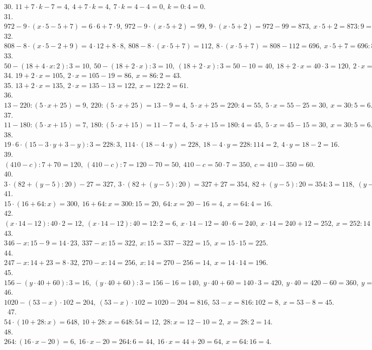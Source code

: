 \documentclass[12pt]{article}
\begin{document}
30. $11+7\cdot k-7=4,\ 4+7\cdot k=4,\ 7\cdot k =4-4=0,\ k=0:4=0.$\\
31. $972-9\cdot(x\cdot 5-5+7)=6\cdot6+7\cdot9,\ 972-9\cdot(x\cdot 5+2)=99,\ 9\cdot(x\cdot 5+2)=972-99=873,\ x\cdot 5+2=873:9=97,\ x\cdot 5=97-2=95,\ x=95:5=19.$\\
32. $808-8\cdot(x\cdot5-2+9)=4\cdot12+8\cdot8,\ 808-8\cdot(x\cdot5+7)=112,\ 8\cdot(x\cdot5+7)=808-112=696,\ x\cdot5+7=696:8=87,\ x\cdot5=87-7=80,\ x=80:5=16.$\\
33. $50-(18+4\cdot x:2):3=10,\ 50-(18+2\cdot x):3=10,\ (18+2\cdot x):3=50-10=40,\ 18+2\cdot x=40\cdot3=120,\ 2\cdot x=120-18=102,\ x=102:2=51.$\\
34. $19+2\cdot x=105,\ 2\cdot x=105-19=86,\ x=86:2=43.$\\
35. $13+2\cdot x=135,\ 2\cdot x=135-13=122,\ x=122:2=61.$\\
36. $13-220:(5\cdot x+25)=9,\ 220:(5\cdot x+25)=13-9=4,\ 5\cdot x+25=220:4=55,\ 5\cdot x=55-25=30,\ x=30:5=6.$\\
37. $11-180:(5\cdot x+15)=7,\ 180:(5\cdot x+15)=11-7=4,\ 5\cdot x+15=180:4=45,\ 5\cdot x =45-15=30,\ x=30:5=6.$\\
38. $19\cdot6\cdot(15-3\cdot y+3-y):3=228:3,\ 114\cdot(18-4\cdot y)=228,\ 18-4\cdot y=228:114=2,\ 4\cdot y=18-2=16.$\\
39. $(410-c):7+70=120,\ (410-c):7=120-70=50,\ 410-c=50\cdot7=350,\ c=410-350=60.$\\
40. $3\cdot(82+(y-5):20)-27=327,\ 3\cdot(82+(y-5):20)=327+27=354,\ 82+(y-5):20=354:3=118,\ (y-5):20=118-82=36,\ y-5=36\cdot20=720,\ y=720+5=725.$\\
41. $15\cdot(16+64:x)=300,\ 16+64:x=300:15=20,\ 64:x=20-16=4,\ x=64:4=16.$\\
42. $(x\cdot14-12):40\cdot2=12,\ (x\cdot14-12):40=12:2=6,\ x\cdot14-12=40\cdot6=240,\ x\cdot14=240+12=252,\ x=252:14=18.$\\
43. $346-x:15-9=14\cdot23,\ 337-x:15=322,\ x:15=337-322=15,\ x=15\cdot15=225.$\\
44. $247-x:14+23=8\cdot32,\ 270-x:14=256,\ x:14=270-256=14,\ x=14\cdot14=196.$\\
45. $156-(y\cdot40+60):3=16,\ (y\cdot40+60):3=156-16=140,\ y\cdot40+60=140\cdot3=420,\ y\cdot40=420-60=360,\ y=360:40=9.$\\
46. $1020-(53-x)\cdot102=204,\ (53-x)\cdot102=1020-204=816,\ 53-x=816:102=8,\ x=53-8=45.$\
47. $54\cdot(10+28:x)=648,\ 10+28:x=648:54=12,\ 28:x=12-10=2,\ x=28:2=14.$\\
48. $264:(16\cdot x-20)=6,\ 16\cdot x-20=264:6=44,\ 16\cdot x=44+20=64,\ x=64:16=4.$\\
\end{document}

